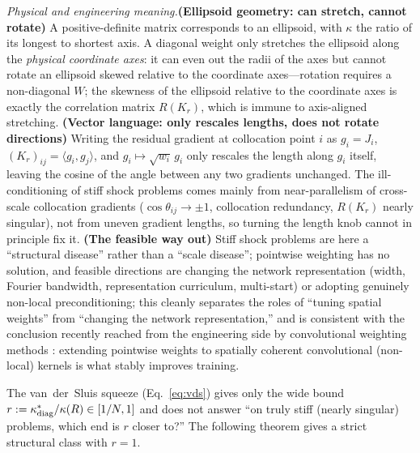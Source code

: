\documentclass[11pt]{article}
\newcommand{\W}{W}
\numberwithin{equation}{section}
\begin{document}
\noindent\emph{Physical and engineering meaning.}\textbf{(Ellipsoid geometry: can stretch, cannot rotate)} A positive-definite matrix corresponds to an ellipsoid, with $\kappa$ the ratio of its longest to shortest axis. A diagonal weight only stretches the ellipsoid along the \emph{physical coordinate axes}: it can even out the radii of the axes but cannot rotate an ellipsoid skewed relative to the coordinate axes---rotation requires a non-diagonal $\W$; the skewness of the ellipsoid relative to the coordinate axes is exactly the correlation matrix $R(K_r)$, which is immune to axis-aligned stretching. \textbf{(Vector language: only rescales lengths, does not rotate directions)} Writing the residual gradient at collocation point $i$ as $g_i=J_i$, $(K_r)_{ij}=\langle g_i,g_j\rangle$, and $g_i\mapsto\sqrt{w_i}\,g_i$ only rescales the length along $g_i$ itself, leaving the cosine of the angle between any two gradients unchanged. The ill-conditioning of stiff shock problems comes mainly from near-parallelism of cross-scale collocation gradients ($\cos\theta_{ij}\to\pm1$, collocation redundancy, $R(K_r)$ nearly singular), not from uneven gradient lengths, so turning the length knob cannot in principle fix it. \textbf{(The feasible way out)} Stiff shock problems are here a ``structural disease'' rather than a ``scale disease''; pointwise weighting has no solution, and feasible directions are changing the network representation (width, Fourier bandwidth, representation curriculum, multi-start) or adopting genuinely non-local preconditioning; this cleanly separates the roles of ``tuning spatial weights'' from ``changing the network representation,'' and is consistent with the conclusion recently reached from the engineering side by convolutional weighting methods \cite{SiYan2025}: extending pointwise weights to spatially coherent convolutional (non-local) kernels is what stably improves training.

The van~der~Sluis squeeze (Eq.~\eqref{eq:vds}) gives only the wide bound $r:=\kappa^*_{\rm diag}/\kappa(R)\in[1/N,1]$ and does not answer ``on truly stiff (nearly singular) problems, which end is $r$ closer to?'' The following theorem gives a strict structural class with $r=1$.
\end{document}
